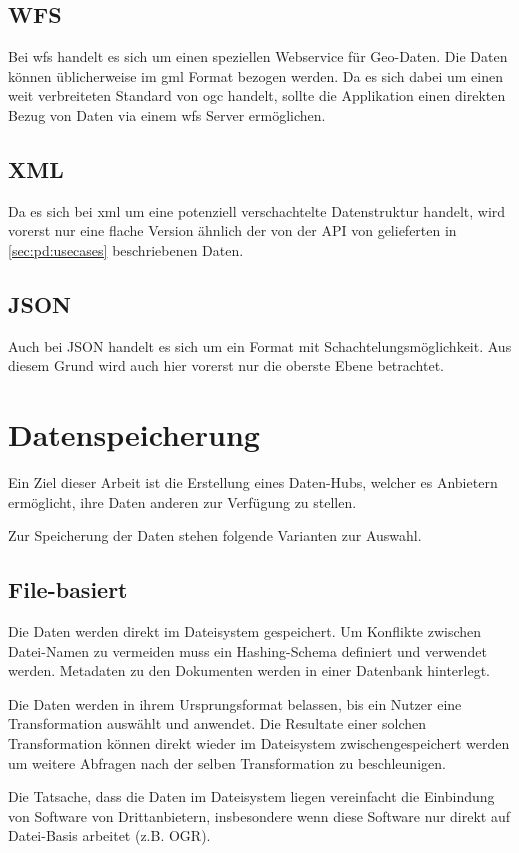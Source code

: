 \subsection{WFS}
Bei \gls{wfs} handelt es sich um einen speziellen Webservice für Geo-Daten. Die Daten können üblicherweise im \gls{gml} Format bezogen werden. Da es sich dabei um einen weit verbreiteten Standard von \gls{ogc} handelt, sollte die Applikation einen direkten Bezug von Daten via einem \acs{wfs} Server ermöglichen.

\subsection{XML}
Da es sich bei \gls{xml} um eine potenziell verschachtelte Datenstruktur handelt, wird vorerst nur eine flache Version ähnlich der von der API von  gelieferten in \cref{sec:pd:usecases} beschriebenen Daten. 

\subsection{JSON}
Auch bei JSON handelt es sich um ein Format mit Schachtelungsmöglichkeit. Aus diesem Grund wird auch hier vorerst nur die oberste Ebene betrachtet.


\section{Datenspeicherung}
Ein Ziel dieser Arbeit ist die Erstellung eines Daten-Hubs, welcher es Anbietern ermöglicht, ihre Daten anderen zur Verfügung zu stellen. 

Zur Speicherung der Daten stehen folgende Varianten zur Auswahl.

\subsection{File-basiert}
Die Daten werden direkt im Dateisystem gespeichert. Um Konflikte zwischen Datei-Namen zu vermeiden muss ein Hashing-Schema definiert und verwendet werden. Metadaten zu den Dokumenten werden in einer Datenbank hinterlegt.

Die Daten werden in ihrem Ursprungsformat belassen, bis ein Nutzer eine Transformation auswählt und anwendet. Die Resultate einer solchen Transformation können direkt wieder im Dateisystem zwischengespeichert werden um weitere Abfragen nach der selben Transformation zu beschleunigen.

Die Tatsache, dass die Daten im Dateisystem liegen vereinfacht die Einbindung von Software von Drittanbietern, insbesondere wenn diese Software nur direkt auf Datei-Basis arbeitet (z.B. OGR).

